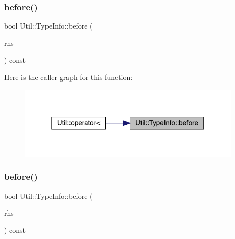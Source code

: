 \subsubsection{\texorpdfstring{before()}{before()}\hspace{0.1cm}{\footnotesize\ttfamily [1/3]}}
{\footnotesize\ttfamily bool Util\+::\+Type\+Info\+::before (\begin{DoxyParamCaption}\item[{const \mbox{\hyperlink{classUtil_1_1TypeInfo}{Type\+Info}} \&}]{rhs }\end{DoxyParamCaption}) const\hspace{0.3cm}{\ttfamily [inline]}}

Here is the caller graph for this function\+:
\nopagebreak
\begin{figure}[H]
\begin{center}
\leavevmode
\includegraphics[width=303pt]{d5/d37/classUtil_1_1TypeInfo_a016c2263e881e81b956718c6571ac637_icgraph}
\end{center}
\end{figure}
\mbox{\label{classUtil_1_1TypeInfo_a016c2263e881e81b956718c6571ac637}} 
\subsubsection{\texorpdfstring{before()}{before()}\hspace{0.1cm}{\footnotesize\ttfamily [2/3]}}
{\footnotesize\ttfamily bool Util\+::\+Type\+Info\+::before (\begin{DoxyParamCaption}\item[{const \mbox{\hyperlink{classUtil_1_1TypeInfo}{Type\+Info}} \&}]{rhs }\end{DoxyParamCaption}) const}

\mbox{\label{classUtil_1_1TypeInfo_a016c2263e881e81b956718c6571ac637}} 
